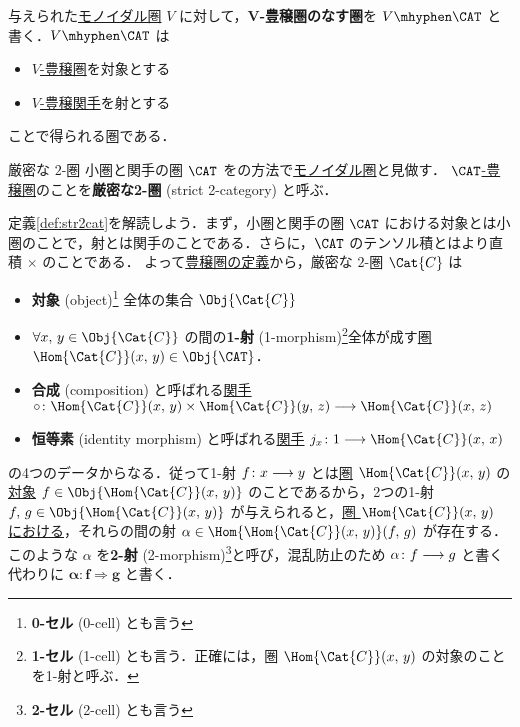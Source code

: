 \documentclass[TQFT_main]{subfiles}
\begin{document}
与えられた\hyperref[redef:monoidal-category]{モノイダル圏} $V$ に対して，\textbf{$\bm{V}$-豊穣圏のなす圏}を $V\mhyphen\CAT$ と書く．$V\mhyphen\CAT$ は
\begin{itemize}
    \item \hyperref[redef:enriched]{$V$-豊穣圏}を対象とする
    \item \hyperref[redef:enriched]{$V$-豊穣関手}を射とする
\end{itemize}
ことで得られる圏である．

\begin{mydef}[label=def:str2cat]{厳密な $2$-圏}
    小圏と関手の圏 $\CAT$ をの方法で\hyperref[redef:monoidal-category]{モノイダル圏}と見做す．
    \hyperref[redef:enriched]{$\CAT$-豊穣圏}のことを\textbf{厳密な2-圏} (strict 2-category) と呼ぶ．
\end{mydef}

定義\ref{def:str2cat}を解読しよう．まず，小圏と関手の圏 $\CAT$ における対象とは小圏のことで，射とは関手のことである．さらに，$\CAT$ のテンソル積とはより直積 $\times$ のことである．
よって\hyperref[redef:enriched]{豊穣圏の定義}から，厳密な $2$-圏 $\Cat{C}$ は
\begin{itemize}
    \item \textbf{対象} (object)\footnote{\textbf{0-セル} (0-cell) とも言う} 全体の集合 $\Obj{\Cat{C}}$ 
    \item $\forall x,\, y \in \Obj{\Cat{C}}$ の間の\textbf{1-射} (1-morphism)\footnote{\textbf{1-セル} (1-cell) とも言う．正確には，圏 $\Hom{\Cat{C}}(x,\, y)$ の対象のことを1-射と呼ぶ．}全体が成す\underline{圏} $\Hom{\Cat{C}} (x,\, y) \in \Obj{\CAT}$．
    \item \textbf{合成} (composition) と呼ばれる\underline{関手} $\circ \colon \Hom{\Cat{C}}(x,\, y) \times \Hom{\Cat{C}} (y,\, z) \lto \Hom{\Cat{C}} (x,\, z)$ 
    \item \textbf{恒等素} (identity morphism) と呼ばれる\underline{関手} $j_x \colon 1 \lto \Hom{\Cat{C}}(x,\, x)$ 
\end{itemize}
の4つのデータからなる．従って1-射 $f \colon x \longrightarrow y$ とは\underline{圏} $\Hom{\Cat{C}}(x,\, y)$ の\underline{対象} $f \in \Obj{\Hom{\Cat{C}} (x,\, y)}$ のことであるから，2つの1-射 $f,\, g \in \Obj{\Hom{\Cat{C}}(x,\, y)}$ が与えられると，\underline{圏 $\Hom{\Cat{C}}(x,\, y)$ における}，それらの間の射 $\alpha \in \Hom{\Hom{\Cat{C}}(x,\, y)}(f,\, g)$ が存在する．
このような $\alpha$ を\textbf{2-射} (2-morphism)\footnote{\textbf{2-セル} (2-cell) とも言う}と呼び，混乱防止のため $\alpha \colon f \longrightarrow g$ と書く代わりに $\bm{\alpha \colon f \Longrightarrow g}$ と書く．
\end{document}

